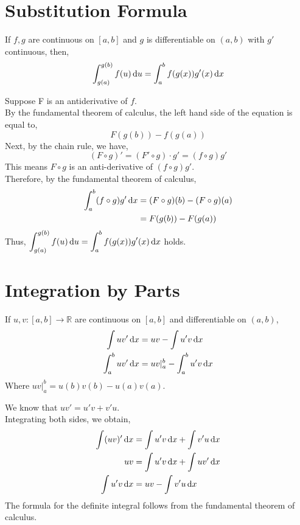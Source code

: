 \documentclass[12pt]{article}
\begin{document}
\section{Substitution Formula}
\begin{theo}{}
If \(f, g\) are continuous on \([a, b]\) and \(g\) is differentiable on \((a, b)\) with \(g'\) continuous, then,\\
\[\displaystyle\int_{g(a)}^{g(b)} f(u) \,\mathrm{d} u = \displaystyle\int_a^b f(g(x))g'(x)\,\mathrm{d} x\]    
\end{theo}
\begin{prf}{}
Suppose F is an antiderivative of \(f\).\\
By the fundamental theorem of calculus, the left hand side of the equation is equal to, 
\[F(g(b)) - f(g(a))\]
Next, by the chain rule, we have, \[(F\circ g)' = (F'\circ g)\cdot g' = (f\circ g)g'\]
This means \(F\circ g\) is an anti-derivative of \((f\circ g)g'\).\\
Therefore, by the fundamental theorem of calculus, 
\begin{align*}
\displaystyle\int_a^b (f\circ g)g'\,\mathrm{d} x &= (F\circ g)(b) - (F\circ g)(a)\\
&= F(g(b)) - F(g(a))
\end{align*}
Thus, \(\displaystyle\int_{g(a)}^{g(b)} f(u) \,\mathrm{d} u = \displaystyle\int_a^b f(g(x))g'(x)\,\mathrm{d} x\) holds.
\end{prf}

\section{Integration by Parts}
\begin{theo}{}
If \(u, v: [a, b] \to \mathbb R\) are continuous on \([a, b]\) and differentiable on \((a, b)\),
\begin{align*}
    \displaystyle\int uv' \,\mathrm{d} x &= uv - \displaystyle\int u'v \,\mathrm{d} x\\
    \displaystyle\int_a^b uv' \,\mathrm{d} x &= uv\rvert_a^b - \displaystyle\int_a^b u'v \,\mathrm{d} x 
\end{align*}    
Where \(uv\rvert_a^b = u(b)v(b) - u(a)v(a)\).\\
\end{theo}
\begin{prf}{}
We know that \(uv' = u'v + v'u\).\\
Integrating both sides, we obtain,
\begin{align*}
    \displaystyle\int (uv)' \,\mathrm{d} x &= \displaystyle\int u'v\,\mathrm{d} x + \displaystyle\int v'u \,\mathrm{d} x\\
    uv &= \displaystyle\int u'v\,\mathrm{d} x + \displaystyle\int uv' \,\mathrm{d} x\\
    \displaystyle\int u'v \,\mathrm{d} x &= uv - \displaystyle\int v'u \,\mathrm{d} x
\end{align*}    
The formula for the definite integral follows from the fundamental theorem of calculus.\\
\end{prf}
\end{document}
